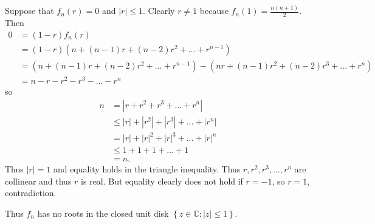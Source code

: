 Suppose that $f_n\left(r\right)=0$ and $\left|r\right|\leq1$. Clearly $r\neq1$ because $f_n\left(1\right)=\frac{n\left(n+1\right)}{2}$. Then
\begin{align*}
	0&=\left(1-r\right)f_n\left(r\right)\\
	&=\left(1-r\right)\left(n+\left(n-1\right)r+\left(n-2\right)r^2+\ldots+r^{n-1}\right)\\
	&=\left(n+\left(n-1\right)r+\left(n-2\right)r^2+\ldots+r^{n-1}\right)-\left(nr+\left(n-1\right)r^2+\left(n-2\right)r^3+\ldots+r^n\right)\\
	&=n-r-r^2-r^3-\ldots-r^n
\end{align*}
so
\begin{align*}
	n&=\left|r+r^2+r^3+\ldots+r^n\right|\\
	&\leq\left|r\right|+\left|r^2\right|+\left|r^3\right|+\ldots+\left|r^n\right|\\
	&=\left|r\right|+\left|r\right|^2+\left|r\right|^3+\ldots+\left|r\right|^n\\
	&\leq1+1+1+\ldots+1\\
	&=n.
\end{align*}
Thus $\left|r\right|=1$ and equality holds in the triangle inequality. Thus $r,r^2,r^3,\ldots,r^n$ are collinear and thus $r$ is real. But equality clearly does not hold if $r=-1$, so $r=1$, contradiction.

Thus $f_n$ has no roots in the closed unit disk $\left\{z\in\mathbb{C}:\left|z\right|\leq1\right\}$.